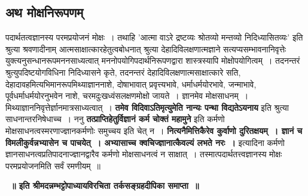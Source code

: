 \subsection*{अथ मोक्षनिरूपणम्}
		पदार्थतत्वज्ञानस्य परमप्रयोजनं मोक्षः~। तथाहि ’आत्मा वाऽरे द्रष्टव्यः श्रोतव्यो मन्तव्यो निदिध्यासितव्यः’ इति श्रुत्या श्रवणादीनाम् आत्मसाक्षात्कारहेतुत्वबोधनात् श्रुत्या देहादिविलक्षणात्मज्ञाने सत्यप्यसम्भावनानिवृत्तेः युक्त्यनुसन्धानरूपमननसाध्यत्वात् मननोपयोगिपदार्थनिरूपणद्वारा शास्त्रस्यापि मोक्षोपयोगित्वम्~। तदनन्तरं श्रुत्युपदिष्टयोगविधिना निदिध्यासने कृते, तदनन्तरं देहादिविलक्षणात्मसाक्षात्कारे सति, देहादावहमित्यभिमानरूपमिथ्याज्ञाननाशे, दोषाभावात् प्रवृत्त्यभावे, धर्माधर्मयोरभावे, जन्माभावे, पूर्वधर्माधर्मयोरनुभवेन नाशे, चरमदुःखध्वंसलक्षणमोक्षो जायते~। ज्ञानमेव मोक्षसाधनम्~। मिथ्याज्ञाननिवृत्तेर्ज्ञानमात्रसाध्यत्वात्~। {\bfseries तमेव विदिवाऽतिमृत्युमेति नान्यः पन्था विद्यतेऽयनाय} इति श्रुत्या साधनान्तरनिषेधाच्च~। ननु {\bfseries तत्प्राप्तिहेतुर्विज्ञानं कर्म चोक्तं महामुने} इति कर्मणो मोक्षसाधनत्वस्मरणाज्ज्ञानकर्मणोः समुच्चय इति चेत् न~। {\bfseries नित्यनैमित्तिकैरेव कुर्वाणो दुरितक्षयम्~। ज्ञानं च विमलीकुर्वन्नभ्यासेन च पाचयेत्~। अभ्यासाच्च क्वचिज्ज्ञानात्कैवल्यं लभते नरः~।} इत्यादिना कर्मणो ज्ञानसाधनत्वप्रतिपादनाज्ज्ञानद्वारैव कर्मणो मोक्षसाधनत्वं न साक्षात्~। तस्मात्पदार्थतत्त्वज्ञानस्य मोक्षः परमप्रयोजनमिति सर्वं रमणीयम्~॥
	\begin{center}
	{\bfseries~॥ इति श्रीमदन्नम्भट्टोपाध्यायविरचिता तर्कसङ्ग्रहदीपिका समाप्ता~॥}\\[10pt]
	\end{center}
	
